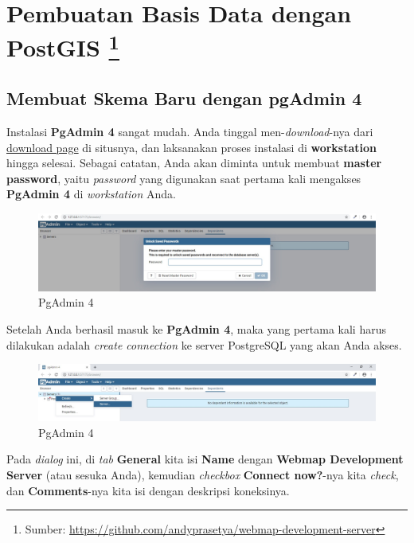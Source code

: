 \documentclass[]{book}
\let\rmarkdownfootnote\footnote%
\def\footnote{\protect\rmarkdownfootnote}
\begin{document}
\hypertarget{pembuatan-basis-data-dengan-postgis}{%
\section[Pembuatan Basis Data dengan PostGIS ]{\texorpdfstring{Pembuatan Basis Data dengan PostGIS \footnote{Sumber: \url{https://github.com/andyprasetya/webmap-development-server}}}{Pembuatan Basis Data dengan PostGIS }}\label{pembuatan-basis-data-dengan-postgis}}

\hypertarget{membuat-skema-baru-dengan-pgadmin-4}{%
\subsection{Membuat Skema Baru dengan pgAdmin 4}\label{membuat-skema-baru-dengan-pgadmin-4}}

Instalasi \textbf{PgAdmin 4} sangat mudah. Anda tinggal men-\emph{download}-nya dari \href{https://www.pgadmin.org/download/}{download page} di situsnya, dan laksanakan proses instalasi di \textbf{workstation} hingga selesai. Sebagai catatan, Anda akan diminta untuk membuat \textbf{master password}, yaitu \emph{password} yang digunakan saat pertama kali mengakses \textbf{PgAdmin 4} di \emph{workstation} Anda.

\begin{figure}
\centering
\includegraphics{./img/pgadmin4-master-password.jpg}
\caption{PgAdmin 4}
\end{figure}

Setelah Anda berhasil masuk ke \textbf{PgAdmin 4}, maka yang pertama kali harus dilakukan adalah \emph{create connection} ke server PostgreSQL yang akan Anda akses.

\begin{figure}
\centering
\includegraphics{./img/pgadmin4-create.jpg}
\caption{PgAdmin 4}
\end{figure}

Pada \emph{dialog} ini, di \emph{tab} \textbf{General} kita isi \textbf{Name} dengan \textbf{Webmap Development Server} (atau sesuka Anda), kemudian \emph{checkbox} \textbf{Connect now?}-nya kita \emph{check}, dan \textbf{Comments}-nya kita isi dengan deskripsi koneksinya.
\end{document}
